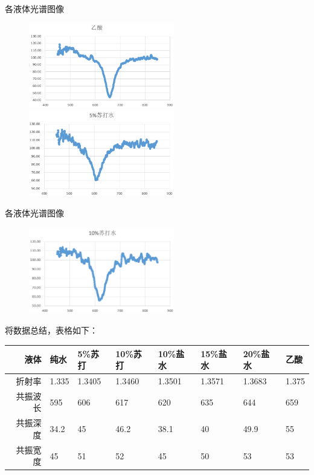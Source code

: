 \documentclass{beamer}
\begin{document}
\begin{frame}{各液体光谱图像}
  \begin{figure}[htbp]
    \centering
    \begin{minipage}[htbp]{180pt}
      \centering
      \includegraphics[width=180pt]{images/3_5.png}
    \end{minipage}
    \hspace{10pt}%
    \begin{minipage}[htpb]{180pt}
      \centering
      \includegraphics[width=180pt]{images/3_6.png}
    \end{minipage}
    \end{figure}
\end{frame}

\begin{frame}{各液体光谱图像}
  \begin{figure}
    \includegraphics[width=180pt]{images/3_7.png}
  \end{figure} 
  将数据总结，表格如下：
  \begin{table}
    \scriptsize
  \begin{tabular}{rlllllll}
    \toprule
    液体& 纯水& 5\%苏打& 10\%苏打& 10\%盐水& 15\%盐水& 20\%盐水& 乙酸\\
    \midrule
    折射率& 1.335& 1.3405& 1.3460& 1.3501& 1.3571& 1.3683& 1.375\\
    共振波长& 595& 606& 617& 620& 635& 644& 659\\
    共振深度& 34.2& 45& 46.2& 38.1& 40& 49.9& 55\\
    共振宽度& 45& 51& 52& 45& 50& 53& 53\\
    \bottomrule
    \end{tabular}
  \end{table}
\end{frame}
\end{document}
